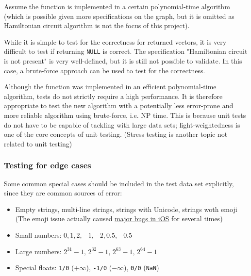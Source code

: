 Assume the function is implemented in a certain polynomial-time algorithm
(which is possible given more specifications on the graph,
but it is omitted as Hamiltonian circuit algorithm is not the focus of this project).

While it is simple to test for the correctness for returned vectors, it is very difficult to test if returning \texttt{NULL} is correct.
The specification "Hamiltonian circuit is not present" is very well-defined, but it is still not possible to validate.
In this case, a brute-force approach can be used to test for the correctness.

Although the function was implemented in an efficient polynomial-time algorithm, tests do not strictly require a high performance.
It is therefore appropriate to test the new algorithm
with a potentially less error-prone and more reliable algorithm using brute-force, i.e. NP time.
This is because unit tests do not have to be capable of tackling with large data sets;
light-weightedness is one of the core concepts of unit testing.
(Stress testing is another topic not related to unit testing)

\subsubsection{Testing for edge cases}
Some common special cases should be included in the test data set explicitly, since they are common sources of error:

\begin{itemize}
	\item Empty strings, multi-line strings, strings with Unicode, strings woth emoji (The emoji issue actually caused
		\href{http://mentalfloss.com/article/544039/how-get-past-iphone-crashing-death-emoji}{major bugs in iOS} for several times)
	\item Small numbers: $0, 1, 2, -1, -2, 0.5, -0.5$
	\item Large numbers: $2^{31}-1$, $2^{32}-1$, $2^{63}-1$, $2^{64}-1$
	\item Special floats: \texttt{1/0} ($+\infty$), \texttt{-1/0} ($-\infty$), \texttt{0/0} (\texttt{NaN})
\end{itemize}
